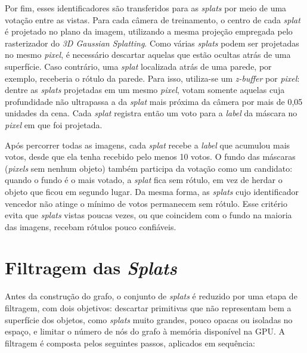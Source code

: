 Por fim, esses identificadores são transferidos para as \emph{splats} por meio de uma votação entre as vistas. Para cada câmera de treinamento, o centro de cada \emph{splat} é projetado no plano da imagem, utilizando a mesma projeção empregada pelo rasterizador do \textit{3D Gaussian Splatting}. Como várias \emph{splats} podem ser projetadas no mesmo \textit{pixel}, é necessário descartar aquelas que estão ocultas atrás de uma superfície. Caso contrário, uma \emph{splat} localizada atrás de uma parede, por exemplo, receberia o rótulo da parede. Para isso, utiliza-se um \textit{z-buffer} por \textit{pixel}: dentre as \emph{splats} projetadas em um mesmo \textit{pixel}, votam somente aquelas cuja profundidade não ultrapassa a da \emph{splat} mais próxima da câmera por mais de 0,05 unidades da cena. Cada \emph{splat} registra então um voto para a \textit{label} da máscara no \textit{pixel} em que foi projetada.

Após percorrer todas as imagens, cada \emph{splat} recebe a \textit{label} que acumulou mais votos, desde que ela tenha recebido pelo menos 10 votos. O fundo das máscaras (\textit{pixels} sem nenhum objeto) também participa da votação como um candidato: quando o fundo é o mais votado, a \emph{splat} fica sem rótulo, em vez de herdar o objeto que ficou em segundo lugar. Da mesma forma, as \emph{splats} cujo identificador vencedor não atinge o mínimo de votos permanecem sem rótulo. Esse critério evita que \emph{splats} vistas poucas vezes, ou que coincidem com o fundo na maioria das imagens, recebam rótulos pouco confiáveis.

\section{Filtragem das \emph{Splats}}

Antes da construção do grafo, o conjunto de \emph{splats} é reduzido por uma etapa de filtragem, com dois objetivos: descartar primitivas que não representam bem a superfície dos objetos, como \emph{splats} muito grandes, pouco opacas ou isoladas no espaço, e limitar o número de nós do grafo à memória disponível na GPU. A filtragem é composta pelos seguintes passos, aplicados em sequência:

